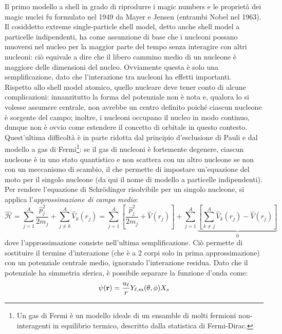 Il primo modello a shell in grado di riprodurre i magic numbers e le proprietà dei magic nuclei fu formulato nel 1949 da Mayer e Jensen (entrambi Nobel nel 1963).\\
Il cosiddetto extreme single-particle shell model, detto anche shell model a particelle indipendenti, ha come assunzione di base che i nucleoni possano muoversi nel nucleo per la maggior parte del tempo senza interagire con altri nucleoni: ciò equivale a dire che il libero cammino medio di un nucleone è maggiore delle dimensioni del nucleo. Ovviamente questa è solo una semplificazione, dato che l'interazione tra nucleoni ha effetti importanti.\\
Rispetto allo shell model atomico, quello nucleare deve tener conto di alcune complicazioni: innanzitutto la forma del potenziale non è nota e, qualora lo si volesse assumere centrale, non avrebbe un centro definito poiché ciascun nucleone è sorgente del campo; inoltre, i nucleoni occupano il  nucleo in modo continuo, dunque non è ovvio come estendere il concetto di orbitale in questo contesto. Quest'ultima difficoltà è in parte ridotta dal principio d'esclusione di Pauli e dal modello a gas di Fermi\footnote{Un gas di Fermi è un modello ideale di un ensamble di molti fermioni non-interagenti in equilibrio termico, descritto dalla statistica di Fermi-Dirac.}: se il gas di nucleoni è fortemente degenere, ciascun nucleone è in uno stato quantistico e non scattera con un altro nucleone se non con un meccanismo di scambio, il che permette di impostare un'equazione del moto per il singolo nucleone (da qui il nome di modello a particelle indipendenti).\\
Per rendere l'equazione di Schrödinger risolvibile per un singolo nucleone, si applica l'\textit{approssimazione di campo medio}:
\begin{equation*}
	\hat{\mathcal{H}} = \sum_{j = 1}^{A} \frac{\hat{p}_j^2}{2m_j} + \sum_{j \neq k}^{A} \hat{V}_k(r_j) = \sum_{j = 1}^{A} \left[ \frac{\hat{p}_j^2}{2m_j} + \hat{V}(r_j) \right] + \sum_{j = 1}^{A} \underbrace{\left[ \sum_{k \neq j}^{A} \hat{V}_k(r_j) - \hat{V}(r_j) \right]}_{0}
\end{equation*}
dove l'approssimazione consiste nell'ultima semplificazione. Ciò permette di sostituire il termine d'interazione (che è a 2 corpi solo in prima approssimazione) con un potenziale centrale medio, ignorando l'interazione residua. Dato che il potenziale ha simmetria sferica, è possibile separare la funzione d'onda come:
\begin{equation}
	\psi(\mathbf{r}) = \frac{u_{\ell}}{r} Y_{\ell,m}(\theta,\phi) X_s
	\label{eq:5.3}
\end{equation}
